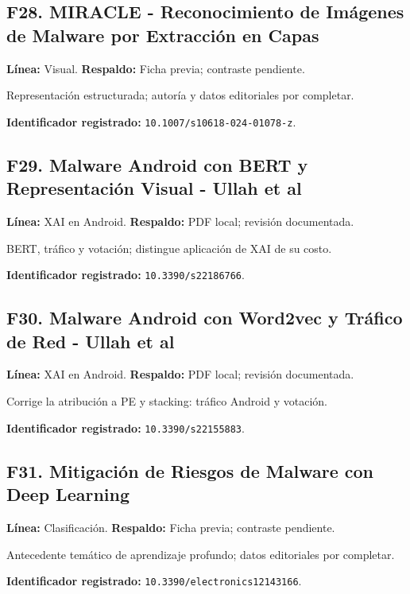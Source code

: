 \begin{samepage}
\subsection*{F28. MIRACLE - Reconocimiento de Imágenes de Malware por Extracción en Capas}
\noindent\textbf{Línea:} Visual. \textbf{Respaldo:} Ficha previa; contraste pendiente. 

Representación estructurada; autoría y datos editoriales por completar.

\noindent\textbf{Identificador registrado:} \nolinkurl{10.1007/s10618-024-01078-z}.

\end{samepage}
\begin{samepage}
\subsection*{F29. Malware Android con BERT y Representación Visual - Ullah et al}
\noindent\textbf{Línea:} XAI en Android. \textbf{Respaldo:} PDF local; revisión documentada. \parencite{Ullah2022BERT}

BERT, tráfico y votación; distingue aplicación de XAI de su costo.

\noindent\textbf{Identificador registrado:} \nolinkurl{10.3390/s22186766}.

\end{samepage}
\begin{samepage}
\subsection*{F30. Malware Android con Word2vec y Tráfico de Red - Ullah et al}
\noindent\textbf{Línea:} XAI en Android. \textbf{Respaldo:} PDF local; revisión documentada. \parencite{Ullah2022Word2vec}

Corrige la atribución a PE y stacking: tráfico Android y votación.

\noindent\textbf{Identificador registrado:} \nolinkurl{10.3390/s22155883}.

\end{samepage}
\begin{samepage}
\subsection*{F31. Mitigación de Riesgos de Malware con Deep Learning}
\noindent\textbf{Línea:} Clasificación. \textbf{Respaldo:} Ficha previa; contraste pendiente. 

Antecedente temático de aprendizaje profundo; datos editoriales por completar.

\noindent\textbf{Identificador registrado:} \nolinkurl{10.3390/electronics12143166}.

\end{samepage}
